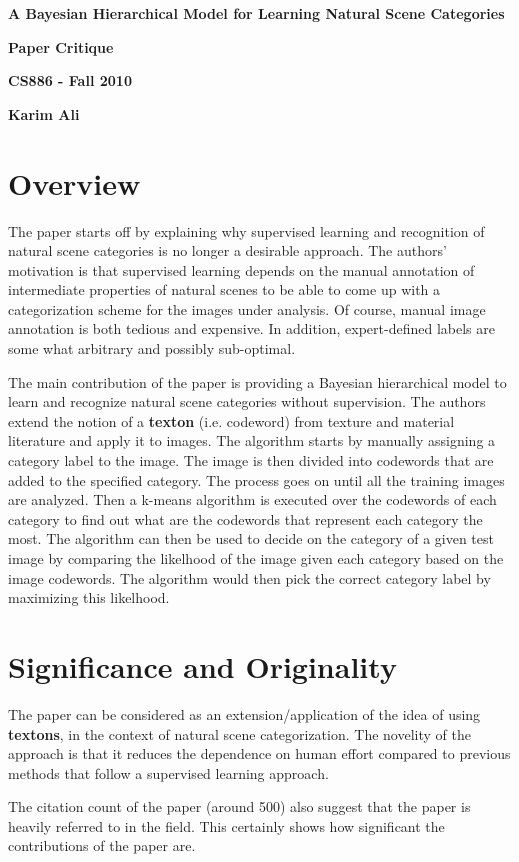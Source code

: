 \documentclass[11pt,a4paper]{article}
\begin{document}
\centerline{\sc \large \textbf{A Bayesian Hierarchical Model for Learning Natural Scene Categories}}
\centerline{\textbf{Paper Critique}}
\centerline{\textbf{CS886 - Fall 2010}}
\centerline{\textbf{Karim Ali}}
\vspace{2pc}

\section{Overview}
The paper starts off by explaining why supervised learning and recognition of natural scene categories is no longer a desirable approach. The authors'
motivation is that supervised learning depends on the manual annotation of intermediate properties of natural scenes to be able to come up with a categorization
scheme for the images under analysis. Of course, manual image annotation is both tedious and expensive. In addition, expert-defined labels are some what
arbitrary and possibly sub-optimal.

The main contribution of the paper is providing a Bayesian hierarchical model to learn and recognize natural scene categories without supervision. The authors
extend the notion of a \textbf{texton} (i.e. codeword) from texture and material literature and apply it to images. The algorithm starts by manually assigning a
category label to the image. The image is then divided into codewords that are added to the specified category. The process goes on until all the training
images are analyzed. Then a k-means algorithm is executed over the codewords of each category to find out what are the codewords that represent each
category the most. The algorithm can then be used to decide on the category of a given test image by comparing the likelhood of the image given each category
based on the image codewords. The algorithm would then pick the correct category label by maximizing this likelhood.

\section{Significance and Originality}
The paper can be considered as an extension/application of the idea of using \textbf{textons}, in the context of natural scene categorization. The novelity of
the approach is that it reduces the dependence on human effort compared to previous methods that follow a supervised learning approach.

The citation count of the paper (around 500) also suggest that the paper is heavily referred to in the field. This certainly shows how significant the
contributions of the paper are.
\end{document}
